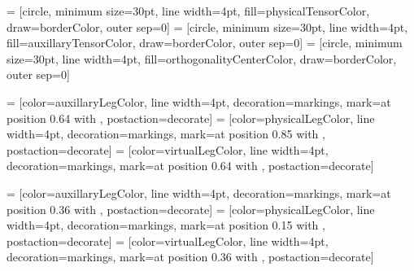 \usepackage{tikz}
\usepackage{ifthen}

\usetikzlibrary{decorations.markings}
\usetikzlibrary{arrows.meta}


\def \defaultTensorWidth {30pt}
\def \defaultLineWidth {4pt}
\def \xOffsetUnitCell {150pt}
\def \yOffsetUnitCell {150pt}
\def \yOffsetPhysicalLeg {50pt}

 = [circle, minimum size=\defaultTensorWidth, line width=\defaultLineWidth, fill=physicalTensorColor, draw=borderColor, outer sep=0]
 = [circle, minimum size=\defaultTensorWidth, line width=\defaultLineWidth, fill=auxillaryTensorColor, draw=borderColor, outer sep=0]
 = [circle, minimum size=\defaultTensorWidth, line width=\defaultLineWidth, fill=orthogonalityCenterColor, draw=borderColor, outer sep=0]

 = [color=auxillaryLegColor, line width=\defaultLineWidth, decoration={markings, mark=at position 0.64 with {}}, postaction={decorate}]
 = [color=physicalLegColor, line width=\defaultLineWidth, decoration={markings, mark=at position 0.85 with {}}, postaction={decorate}]
 = [color=virtualLegColor, line width=\defaultLineWidth, decoration={markings, mark=at position 0.64 with {}}, postaction={decorate}]

 = [color=auxillaryLegColor, line width=\defaultLineWidth, decoration={markings, mark=at position 0.36 with {}}, postaction={decorate}]
 = [color=physicalLegColor, line width=\defaultLineWidth, decoration={markings, mark=at position 0.15 with {}}, postaction={decorate}]
 = [color=virtualLegColor, line width=\defaultLineWidth, decoration={markings, mark=at position 0.36 with {}}, postaction={decorate}]

